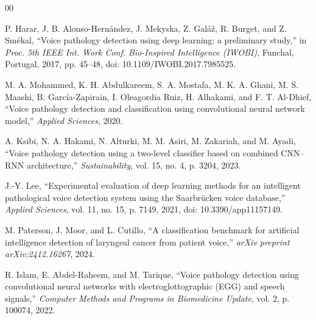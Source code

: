 \documentclass[conference]{IEEEtran}
\begin{document}
\begin{thebibliography}{00}

 P. Harar, J. B. Alonso-Hern\'andez, J. Mekyska, Z. Gal\'a\v{z}, R. Burget, and Z. Sm\'ekal, ``Voice pathology detection using deep learning: a preliminary study,'' in \emph{Proc. 5th IEEE Int. Work Conf. Bio-Inspired Intelligence (IWOBI)}, Funchal, Portugal, 2017, pp. 45--48, doi: 10.1109/IWOBI.2017.7985525.

 M. A. Mohammed, K. H. Abdulkareem, S. A. Mostafa, M. K. A. Ghani, M. S. Maashi, B. Garc\'ia-Zapirain, I. Oleagordia Ruiz, H. Alhakami, and F. T. Al-Dhief, ``Voice pathology detection and classification using convolutional neural network model,'' \emph{Applied Sciences}, 2020.

 A. Ksibi, N. A. Hakami, N. Alturki, M. M. Asiri, M. Zakariah, and M. Ayadi, ``Voice pathology detection using a two-level classifier based on combined CNN--RNN architecture,'' \emph{Sustainability}, vol. 15, no. 4, p. 3204, 2023.

 J.-Y. Lee, ``Experimental evaluation of deep learning methods for an intelligent pathological voice detection system using the Saarbr\"ucken voice database,'' \emph{Applied Sciences}, vol. 11, no. 15, p. 7149, 2021, doi: 10.3390/app11157149.

 M. Paterson, J. Moor, and L. Cutillo, ``A classification benchmark for artificial intelligence detection of laryngeal cancer from patient voice,'' \emph{arXiv preprint arXiv:2412.16267}, 2024.

 R. Islam, E. Abdel-Raheem, and M. Tarique, ``Voice pathology detection using convolutional neural networks with electroglottographic (EGG) and speech signals,'' \emph{Computer Methods and Programs in Biomedicine Update}, vol. 2, p. 100074, 2022.

\end{thebibliography}
\end{document}
